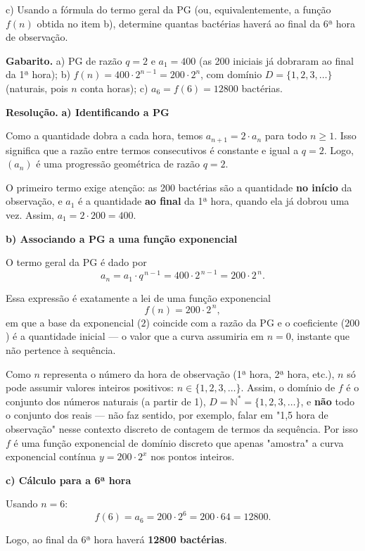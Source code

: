 c) Usando a fórmula do termo geral da PG (ou, equivalentemente, a função $f(n)$ obtida no item b), determine quantas bactérias haverá ao final da 6ª hora de observação.

\textbf{Gabarito.} a) PG de razão $q=2$ e $a_1=400$ (as 200 iniciais já dobraram ao final da 1ª hora); b) $f(n)=400\cdot 2^{n-1}=200\cdot 2^{n}$, com domínio $D=\{1,2,3,\dots\}$ (naturais, pois $n$ conta horas); c) $a_6 = f(6) = 12800$ bactérias.

\textbf{Resolução.} \textbf{a) Identificando a PG}

Como a quantidade dobra a cada hora, temos $a_{n+1} = 2\cdot a_n$ para todo $n \geq 1$. Isso significa que a razão entre termos consecutivos é constante e igual a $q = 2$. Logo, $(a_n)$ é uma progressão geométrica de razão $q=2$.

O primeiro termo exige atenção: as 200 bactérias são a quantidade \textbf{no início} da observação, e $a_1$ é a quantidade \textbf{ao final} da 1ª hora, quando ela já dobrou uma vez. Assim, $a_1 = 2 \cdot 200 = 400$.

\textbf{b) Associando a PG a uma função exponencial}

O termo geral da PG é dado por
$$a_n = a_1 \cdot q^{\,n-1} = 400 \cdot 2^{\,n-1} = 200 \cdot 2^{\,n}.$$

Essa expressão é exatamente a lei de uma função exponencial
$$f(n) = 200 \cdot 2^{\,n},$$
em que a base da exponencial ($2$) coincide com a razão da PG e o coeficiente ($200$) é a quantidade inicial — o valor que a curva assumiria em $n = 0$, instante que não pertence à sequência.

Como $n$ representa o número da hora de observação (1ª hora, 2ª hora, etc.), $n$ só pode assumir valores inteiros positivos: $n \in \{1, 2, 3, \dots\}$. Assim, o domínio de $f$ é o conjunto dos números naturais (a partir de 1), $D = \mathbb{N}^* = \{1,2,3,\dots\}$, e \textbf{não} todo o conjunto dos reais — não faz sentido, por exemplo, falar em "1,5 hora de observação" nesse contexto discreto de contagem de termos da sequência. Por isso $f$ é uma função exponencial de domínio discreto que apenas "amostra" a curva exponencial contínua $y = 200\cdot 2^{x}$ nos pontos inteiros.

\textbf{c) Cálculo para a 6ª hora}

Usando $n=6$:
$$f(6) = a_6 = 200 \cdot 2^{6} = 200 \cdot 64 = 12800.$$

Logo, ao final da 6ª hora haverá \textbf{12800 bactérias}.

\endgroup
